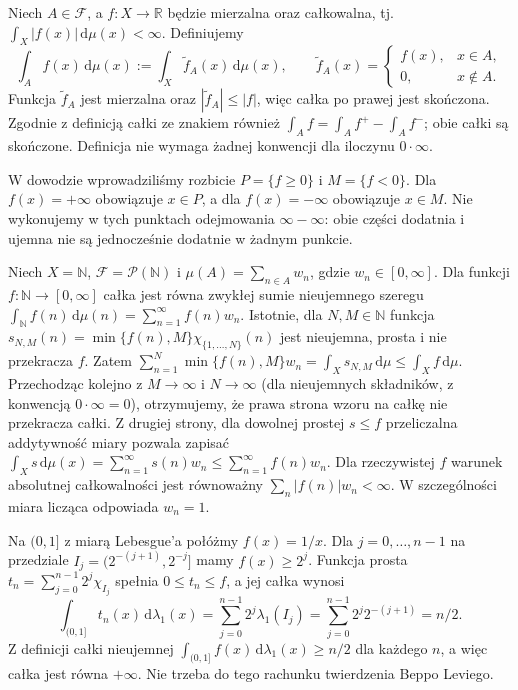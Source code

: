 \begin{definicja}
\label{def:signed-integral-over-set-7}
Niech $A\in\mathcal F$, a $f:X\to\mathbb R$ będzie
mierzalna oraz całkowalna, tj.
$\int_X|f(x)|\,\mathrm d\mu(x)<\infty$.
Definiujemy
\[
\int_A f(x)\,\mathrm d\mu(x)
:=\int_X\widetilde f_A(x)\,\mathrm d\mu(x),
\qquad
\widetilde f_A(x)=
\begin{cases}f(x),&x\in A,\\0,&x\notin A.\end{cases}
\]
Funkcja $\widetilde f_A$ jest mierzalna oraz
$|\widetilde f_A|\le|f|$, więc całka po prawej
jest skończona. Zgodnie z definicją całki ze znakiem
również
$\int_A f=\int_A f^+-\int_A f^-$;
obie całki są skończone. Definicja nie wymaga
żadnej konwencji dla iloczynu $0\cdot\infty$.
\end{definicja}

\begin{uwaga}
W dowodzie wprowadziliśmy rozbicie
$P=\{f\ge0\}$ i $M=\{f<0\}$.
Dla $f(x)=+\infty$ obowiązuje $x\in P$,
a dla $f(x)=-\infty$ obowiązuje $x\in M$.
Nie wykonujemy w tych punktach odejmowania
$\infty-\infty$: obie części dodatnia i ujemna
nie są jednocześnie dodatnie w żadnym punkcie.
\end{uwaga}

\begin{przyklad}
Niech $X=\mathbb N$, $\mathcal F=\mathcal P(\mathbb N)$
i $\mu(A)=\sum_{n\in A}w_n$, gdzie $w_n\in[0,\infty]$.
Dla funkcji $f:\mathbb N\to[0,\infty]$ całka
jest równa zwykłej sumie nieujemnego szeregu
$\int_{\mathbb N} f(n)\,\mathrm d\mu(n)=
\sum_{n=1}^{\infty}f(n)w_n$.
Istotnie, dla $N,M\in\mathbb N$ funkcja
$s_{N,M}(n)=\min\{f(n),M\}\chi_{\{1,\ldots,N\}}(n)$
jest nieujemna, prosta i nie przekracza $f$.
Zatem
$\sum_{n=1}^N\min\{f(n),M\}w_n
=\int_Xs_{N,M}\,\mathrm d\mu
\le\int_Xf\,\mathrm d\mu$.
Przechodząc kolejno z $M\to\infty$ i $N\to\infty$
(dla nieujemnych składników, z konwencją $0\cdot\infty=0$),
otrzymujemy, że prawa strona wzoru na całkę nie
przekracza całki.
Z drugiej strony, dla dowolnej prostej $s\le f$
przeliczalna addytywność miary pozwala zapisać
$\int_X s\,\mathrm d\mu(x)=
\sum_{n=1}^{\infty}s(n)w_n\le\sum_{n=1}^{\infty}f(n)w_n$.
Dla rzeczywistej $f$ warunek absolutnej całkowalności
jest równoważny
$\sum_n|f(n)|w_n<\infty$.
W szczególności miara licząca odpowiada $w_n=1$.
\end{przyklad}

\begin{przyklad}
Na $(0,1]$ z miarą Lebesgue'a połóżmy $f(x)=1/x$.
Dla $j=0,\ldots,n-1$ na przedziale
$I_j=(2^{-(j+1)},2^{-j}]$ mamy $f(x)\ge2^j$.
Funkcja prosta
$t_n=\sum_{j=0}^{n-1}2^j\chi_{I_j}$
spełnia $0\le t_n\le f$, a jej całka wynosi
\[
\int_{(0,1]}t_n(x)\,\mathrm d\lambda_1(x)
=\sum_{j=0}^{n-1}2^j\lambda_1(I_j)
=\sum_{j=0}^{n-1}2^j2^{-(j+1)}=n/2.
\]
Z definicji całki nieujemnej
$\int_{(0,1]}f(x)\,\mathrm d\lambda_1(x)\ge n/2$
dla każdego $n$, a więc całka jest równa $+\infty$.
Nie trzeba do tego rachunku twierdzenia Beppo Leviego.
\end{przyklad}

